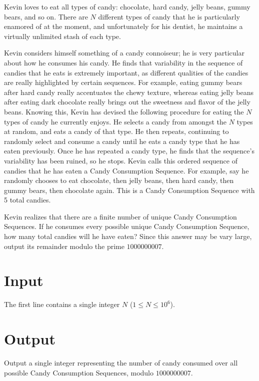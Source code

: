 
Kevin loves to eat all types of candy: chocolate, hard candy, jelly beans, gummy bears, and so on.
There are $N$ different types of candy that he is particularly enamored of at the moment, and unfortunately
for his dentist, he maintains a virtually unlimited stash of each type.

Kevin considers himself something of a candy connoiseur; he is very particular about how he consumes his
candy. He finds that variability in the sequence of candies that he eats is extremely important, as
different qualities of the candies are really highlighted by certain sequences. For example, eating gummy
bears after hard candy really accentuates the chewy texture, whereas eating jelly beans after eating dark
chocolate really brings out the sweetness and flavor of the jelly beans. Knowing this, Kevin has devised the
following procedure for eating the $N$ types of candy he currently enjoys. He selects a candy from amongst
the $N$ types at random, and eats a candy of that type. He then repeats, continuing to randomly select and
consume a candy until he eats a candy type that he has eaten previously. Once he has repeated a candy
type, he finds that the sequence's variability has been ruined, so he stops. Kevin calls this ordered
sequence of candies that he has eaten a Candy Consumption Sequence. For example, say he randomly chooses
to eat chocolate, then jelly beans, then hard candy, then gummy bears, then chocolate again. This is a
Candy Consumption Sequence with 5 total candies.

Kevin realizes that there are a finite number of unique Candy Consumption Sequences. If he consumes every
possible unique Candy Consumption Sequence, how many total candies will he have eaten? Since this answer
may be vary large, output its remainder modulo the prime $1000000007$.

\section*{Input}
The first line contains a single integer $N$ ($1 \leq N \leq 10^6$).

\section*{Output}
Output a single integer representing the number of candy consumed over all possible Candy Consumption
Sequences, modulo $1000000007$.
